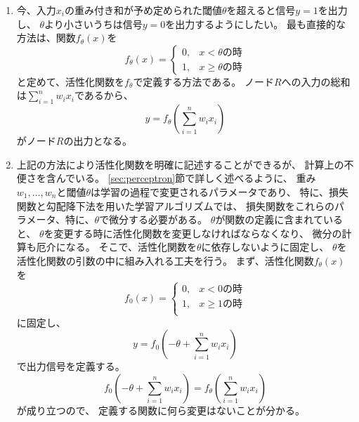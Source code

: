 \begin{enumerate}
\item
  今、入力$x_i$の重み付き和が予め定められた閾値$\theta$を超えると信号$y = 1$を出力し、
  $\theta$より小さいうちは信号$y = 0$を出力するようにしたい。
  最も直接的な方法は、関数$f_\theta(x)$を
  \[
    f_\theta(x) =
    \begin{cases}
      0, & \text{$x < \theta$の時}\\
      1, & \text{$x \ge \theta$の時}
    \end{cases}
  \]
  と定めて、活性化関数を$f_\theta$で定義する方法である。
  ノード$R$への入力の総和は$\displaystyle\sum_{i=1}^n w_i x_i$であるから、
  \[
    y = f_\theta\left(\sum_{i=1}^n w_i x_i\right)
  \]
  がノード$R$の出力となる。
\item
  上記の方法により活性化関数を明確に記述することができるが、
  計算上の不便さを含んでいる。
  \ref{sec:perceptron}節で詳しく述べるように、
  重み$w_1, \dots, w_n$と閾値$\theta$は学習の過程で変更されるパラメータであり、
  特に、損失関数と勾配降下法を用いた学習アルゴリズムでは、
  損失関数をこれらのパラメータ、特に、$\theta$で微分する必要がある。
  $\theta$が関数の定義に含まれていると、
  $\theta$を変更する時に活性化関数を変更しなければならなくなり、
  微分の計算も厄介になる。
  そこで、活性化関数を$\theta$に依存しないように固定し、
  $\theta$を活性化関数の引数の中に組み入れる工夫を行う。
  まず、活性化関数$f_\theta(x)$を
  \[
    f_0(x) =
    \begin{cases}
      0, & \text{$x < 0$の時}\\
      1, & \text{$x \ge 1$の時}\\
    \end{cases}
  \]
  に固定し、
  \[
    y = f_0\left(- \theta + \sum_{i=1}^n w_i x_i\right)
  \]
  で出力信号を定義する。
  \[
    f_0\left(- \theta + \sum_{i=1}^n w_i x_i\right) = f_\theta\left(\sum_{i=1}^n w_i x_i\right)
  \]
  が成り立つので、
  定義する関数に何ら変更はないことが分かる。
  

\end{enumerate}
